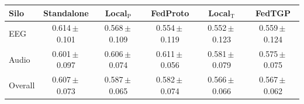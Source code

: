 \begin{tabular}{lccccc}
\toprule
\textbf{Silo} & \textbf{Standalone} & \textbf{Local$_{\mathrm{P}}$} & \textbf{FedProto} & \textbf{Local$_{\mathrm{T}}$} & \textbf{FedTGP} \\
\midrule
EEG & 0.614\,$\pm$\,0.101 & 0.568\,$\pm$\,0.109 & 0.554\,$\pm$\,0.119 & 0.552\,$\pm$\,0.123 & 0.559\,$\pm$\,0.124 \\
Audio & 0.601\,$\pm$\,0.097 & 0.606\,$\pm$\,0.074 & 0.611\,$\pm$\,0.056 & 0.581\,$\pm$\,0.079 & 0.575\,$\pm$\,0.075 \\
\midrule
Overall & 0.607\,$\pm$\,0.073 & 0.587\,$\pm$\,0.065 & 0.582\,$\pm$\,0.074 & 0.566\,$\pm$\,0.066 & 0.567\,$\pm$\,0.062 \\
\bottomrule
\end{tabular}